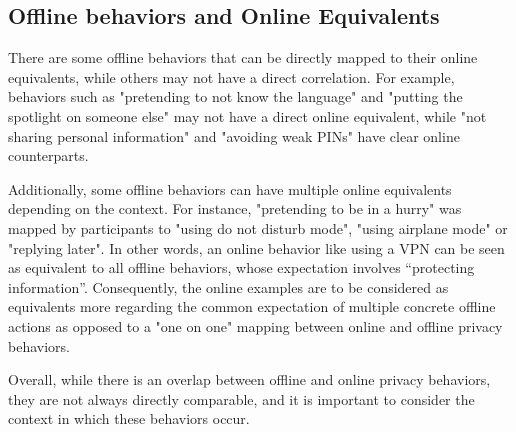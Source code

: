 \subsection{Offline behaviors and Online Equivalents}
\label{Label2}

There are some offline behaviors that can be directly mapped to their online equivalents, while others may not have a direct correlation. For example, behaviors such as "pretending to not know the language" and "putting the spotlight on someone else" may not have a direct online equivalent, while "not sharing personal information" and "avoiding weak PINs" have clear online counterparts. 

Additionally, some offline behaviors can have multiple online equivalents depending on the context. For instance, "pretending to be in a hurry" was mapped by participants to "using do not disturb mode", "using airplane mode" or "replying later". In other words, an online behavior like using a VPN can be seen as equivalent to all offline behaviors, whose expectation involves “protecting information”. Consequently, the online examples are to be considered as equivalents more regarding the common expectation of multiple concrete offline actions as opposed to a "one on one" mapping between online and offline privacy behaviors. 

Overall, while there is an overlap between offline and online privacy behaviors, they are not always directly comparable, and it is important to consider the context in which these behaviors occur. 